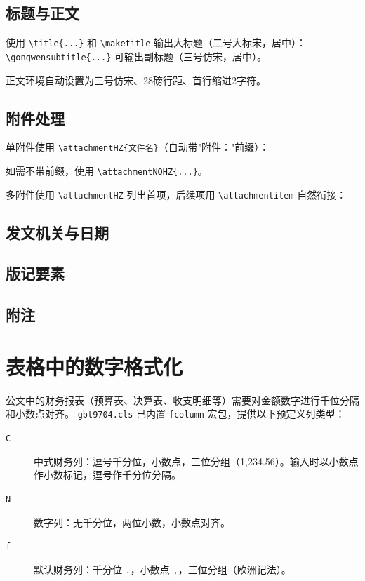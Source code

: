 \documentclass[redline, titleindent, zhlineskip]{gbt9704}
\begin{document}
\subsection{标题与正文}
使用 \verb|\title{...}| 和 \verb|\maketitle| 输出大标题（二号大标宋，居中）：
\verb|\gongwensubtitle{...}| 可输出副标题（三号仿宋，居中）。

正文环境自动设置为三号仿宋、28磅行距、首行缩进2字符。

\subsection{附件处理}
单附件使用 \verb|\attachmentHZ{文件名}|（自动带"附件："前缀）：

如需不带前缀，使用 \verb|\attachmentNOHZ{...}|。

多附件使用 \verb|\attachmentHZ| 列出首项，后续项用 \verb|\attachmentitem| 自然衔接：

\subsection{发文机关与日期}
\signature{中华人民共和国某部}

\subsection{版记要素}
\seprule
{}

\subsection{附注}

\section{表格中的数字格式化}

公文中的财务报表（预算表、决算表、收支明细等）需要对金额数字进行千位分隔和小数点对齐。
\texttt{gbt9704.cls} 已内置 \texttt{fcolumn} 宏包，提供以下预定义列类型：

\begin{description}
  \item[\texttt{C}] 中式财务列：逗号千分位，小数点，三位分组（1,234.56）。输入时以小数点作小数标记，逗号作千分位分隔。
  \item[\texttt{N}] 数字列：无千分位，两位小数，小数点对齐。
  \item[\texttt{f}] 默认财务列：千分位 \texttt{.}，小数点 \texttt{,}，三位分组（欧洲记法）。
\end{description}
\end{document}
